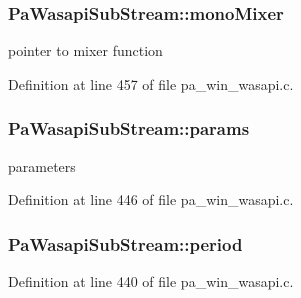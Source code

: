 \subsubsection[{\texorpdfstring{mono\+Mixer}{monoMixer}}]{ Pa\+Wasapi\+Sub\+Stream\+::mono\+Mixer}\hypertarget{struct_pa_wasapi_sub_stream_a5e3eaa16893281c5b4f2ed1382fd214a}{}\label{struct_pa_wasapi_sub_stream_a5e3eaa16893281c5b4f2ed1382fd214a}


pointer to mixer function 



Definition at line 457 of file pa\+\_\+win\+\_\+wasapi.\+c.

\subsubsection[{\texorpdfstring{params}{params}}]{ Pa\+Wasapi\+Sub\+Stream\+::params}\hypertarget{struct_pa_wasapi_sub_stream_ab9cb9497a30f6d0e1497b64896a9e4df}{}\label{struct_pa_wasapi_sub_stream_ab9cb9497a30f6d0e1497b64896a9e4df}


parameters 



Definition at line 446 of file pa\+\_\+win\+\_\+wasapi.\+c.

\subsubsection[{\texorpdfstring{period}{period}}]{ Pa\+Wasapi\+Sub\+Stream\+::period}\hypertarget{struct_pa_wasapi_sub_stream_acfbdb3c9c3d81b98e7338585aac06bc1}{}\label{struct_pa_wasapi_sub_stream_acfbdb3c9c3d81b98e7338585aac06bc1}


Definition at line 440 of file pa\+\_\+win\+\_\+wasapi.\+c.

